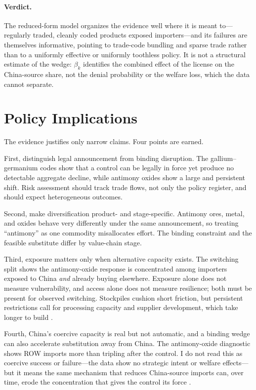\documentclass[12pt,a4paper]{article}
\begin{document}
\paragraph{Verdict.} The reduced-form model organizes the evidence well where it
is meant to---regularly traded, cleanly coded products exposed importers---and
its failures are themselves informative, pointing to trade-code bundling and
sparse trade rather than to a uniformly effective or uniformly toothless policy.
It is not a structural estimate of the wedge: $\beta_k$ identifies the combined
effect of the license on the China-source share, not the denial probability or
the welfare loss, which the data cannot separate.

\section{Policy Implications}\label{sec:policy}

The evidence justifies only narrow claims. Four points are earned.

First, distinguish legal announcement from binding disruption. The
gallium--germanium codes show that a control can be legally in force yet produce
no detectable aggregate decline, while antimony oxides show a large and
persistent shift. Risk assessment should track trade flows, not only the policy
register, and should expect heterogeneous outcomes.

Second, make diversification product- and stage-specific. Antimony ores, metal,
and oxides behave very differently under the same announcement, so treating
``antimony'' as one commodity misallocates effort. The binding constraint and the
feasible substitute differ by value-chain stage.

Third, exposure matters only when alternative capacity exists. The switching
split shows the antimony-oxide response is concentrated among importers exposed
to China \emph{and} already buying elsewhere. Exposure alone does not measure
vulnerability, and access alone does not measure resilience; both must be
present for observed switching. Stockpiles cushion short friction, but persistent
restrictions call for processing capacity and supplier development, which take
longer to build \citep{vandenbrink2022antimony_resilience,
xu2025antimony_material_flow}.

Fourth, China's coercive capacity is real but not automatic, and a binding
wedge can also accelerate substitution away from China. The antimony-oxide
diagnostic shows ROW imports more than tripling after the control. I do not read
this as coercive success or failure---the data show no strategic intent or
welfare effects---but it means the same mechanism that reduces China-source
imports can, over time, erode the concentration that gives the control its force
\citep{iea_2025_global_critical_minerals_outlook}.
\end{document}
